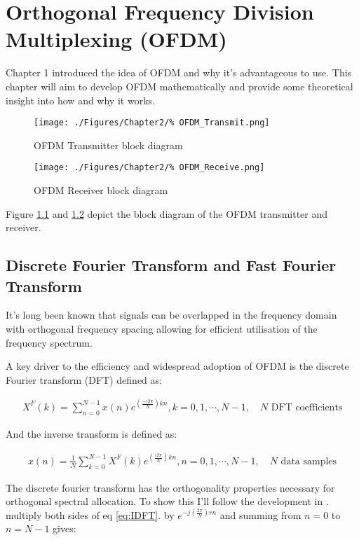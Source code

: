 \chapter{Orthogonal Frequency Division Multiplexing (OFDM)}
\newpage
Chapter 1 introduced the idea of OFDM and why it's %
advantageous to use. This chapter will aim to develop %
OFDM mathematically and provide some theoretical insight %
into how and why it works.
\begin{figure}[ht]
	\centering
	\texttt{[image: ./Figures/Chapter2/\%
	OFDM\_Transmit.png]}
	\caption{OFDM Transmitter block diagram}
	\label{fig:OFDMTransmit}
\end{figure}

\begin{figure}[ht]
	\centering
	\texttt{[image: ./Figures/Chapter2/\%
	OFDM\_Receive.png]}
	\caption{OFDM Receiver block diagram}
	\label{fig:OFDMReceiver}
\end{figure}

Figure \ref{fig:OFDMTransmit} and \ref{fig:OFDMReceiver} %
depict the block diagram of the OFDM transmitter and receiver.

\section{Discrete Fourier Transform and Fast Fourier Transform}

It's long been known that signals can be overlapped in the %
frequency domain with orthogonal frequency spacing %
allowing for efficient utilisation of the %
frequency spectrum\cite{Chang66}.

A key driver to the efficiency and widespread adoption %
of OFDM is the discrete Fourier transform (DFT) defined %
as\cite{Rao2010}:

\begin{align}
	X^F(k) = \sum_{n=0}^{N-1}x(n)e^{(\frac{-i 2\pi}{N})kn}, %
	k=0,1,\cdots,N-1,\quad N \text{ DFT coefficients}
\end{align}

And the inverse transform is defined as:

\begin{align}
	x(n) = \frac{1}{N}\sum_{k=0}^{N-1}X^{F}(k)%
	e^{(\frac{i 2\pi}{N})kn}, n = 0,1,\cdots,N-1, \quad%
	N \text{ data samples}
	\label{eq:IDFT}
\end{align}

The discrete fourier transform has the orthogonality %
properties necessary for orthogonal spectral allocation. %
To show this I'll follow the development in \cite{Opp99}. %
multiply both sides of eq \ref{eq:IDFT}. by %
$e^{-j(\frac{2\pi}{N})rn}$ and summing from $n=0$ %
to $n=N-1$ gives:

